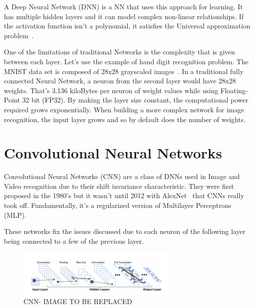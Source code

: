  A Deep Neural Network (DNN) is a NN that uses this approach for learning. It has multiple hidden layers and it can 
 model complex non-linear relationships. If the activation function isn't a polynomial, it satisfies
 the Universal approximation problem~\cite{approximation:problem}.

One of the limitations of traditional Networks is the complexity that is given between each layer. Let's use the example of hand digit recognition problem.
The MNIST data set is composed of 28x28 grayscaled images~\cite{mnist:digits}. In a traditional fully connected Neural Network, a neuron from the second layer
would have 28x28 weights. That's 3.136 kiloBytes per neuron of weight values while using Floating-Point 32 bit (FP32). 
By making the layer size constant, the computational power required grows exponentially.
When building a more complex network for image recognition, the input layer grows and so by default does the number of weights.



 \section{Convolutional Neural Networks}
 \label{section:subcnn}

 \quad Convolutional Neural Networks (CNN) are a class of DNNs used in Image and Video recognition due to their shift invariance characteristic. They were first proposed in the 
 1980's but it wasn't until 2012 with AlexNet~\cite{alexnet} 
 that CNNs really took off. Fundamentally,  it's a regularized version of Multilayer Perceptrons (MLP).

 These networks fix the issues discussed due to each neuron of the following layer being connected to a few of the previous layer.
 

 \begin{figure}[!htbp]
    \centering
    \includegraphics[width=0.7\textwidth]{Figures/convolutionlayer.png}
    \caption{CNN- IMAGE TO BE REPLACED}
    \label{CNNl}
\end{figure} 


